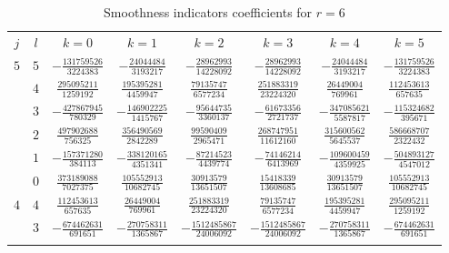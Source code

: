 \begin{table}
  \begin{center}
    \caption{Smoothness indicators coefficients for $r=6$}
    \label{tab:IS_6}
    \begin{tabular}{cccccccc}
      \toprule
      $j$  &  $l$  &  $k=0$                           &  $k=1$                           &  $k=2$                           &  $k=3$                           &  $k=4$                           &  $k=5$                           \\ \addlinespace
      $5$  &  $5$  &  $-\frac{ 131759526}{ 3224383}$  &  $-\frac{  24044484}{ 3193217}$  &  $-\frac{  28962993}{14228092}$  &  $-\frac{  28962993}{14228092}$  &  $-\frac{  24044484}{ 3193217}$  &  $-\frac{ 131759526}{ 3224383}$  \\ \addlinespace
           &  $4$  &  $ \frac{ 295095211}{ 1259192}$  &  $ \frac{ 195395281}{ 4459947}$  &  $ \frac{  79135747}{ 6577234}$  &  $ \frac{ 251883319}{23224320}$  &  $ \frac{  26449004}{  769961}$  &  $ \frac{ 112453613}{  657635}$  \\ \addlinespace
           &  $3$  &  $-\frac{ 427867945}{  780329}$  &  $-\frac{ 146902225}{ 1415767}$  &  $-\frac{  95644735}{ 3360137}$  &  $-\frac{  61673356}{ 2721737}$  &  $-\frac{ 347085621}{ 5587817}$  &  $-\frac{ 115324682}{  395671}$  \\ \addlinespace
           &  $2$  &  $ \frac{ 497902688}{  756325}$  &  $ \frac{ 356490569}{ 2842289}$  &  $ \frac{  99590409}{ 2965471}$  &  $ \frac{ 268747951}{11612160}$  &  $ \frac{ 315600562}{ 5645537}$  &  $ \frac{ 586668707}{ 2322432}$  \\ \addlinespace
           &  $1$  &  $-\frac{ 157371280}{  384113}$  &  $-\frac{ 338120165}{ 4351341}$  &  $-\frac{  87214523}{ 4439774}$  &  $-\frac{  74146214}{ 6413969}$  &  $-\frac{ 109600459}{ 4359925}$  &  $-\frac{ 504893127}{ 4547012}$  \\ \addlinespace
           &  $0$  &  $ \frac{ 373189088}{ 7027375}$  &  $ \frac{ 105552913}{10682745}$  &  $ \frac{  30913579}{13651507}$  &  $ \frac{  15418339}{13608685}$  &  $ \frac{  30913579}{13651507}$  &  $ \frac{ 105552913}{10682745}$  \\ \addlinespace
      $4$  &  $4$  &  $ \frac{ 112453613}{  657635}$  &  $ \frac{  26449004}{  769961}$  &  $ \frac{ 251883319}{23224320}$  &  $ \frac{  79135747}{ 6577234}$  &  $ \frac{ 195395281}{ 4459947}$  &  $ \frac{ 295095211}{ 1259192}$  \\ \addlinespace
           &  $3$  &  $-\frac{ 674462631}{  691651}$  &  $-\frac{ 270758311}{ 1365867}$  &  $-\frac{1512485867}{24006092}$  &  $-\frac{1512485867}{24006092}$  &  $-\frac{ 270758311}{ 1365867}$  &  $-\frac{ 674462631}{  691651}$  \\ \addlinespace

\end{tabular}
\end{center}
\end{table}
